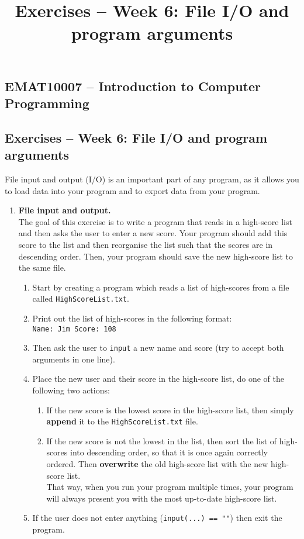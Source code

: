 \documentclass[11pt]{report}
\begin{document}
\title{Exercises -- Week 6: File I/O and program arguments}
\subsection*{EMAT10007 -- Introduction to Computer Programming}
\subsection*{Exercises -- Week 6: File I/O and program arguments}

File input and output (I/O) is an important part of any program, as it allows you to load data into your program and to export data from your program.

\begin{enumerate}
	\item {\bf File input and output.}\\
	The goal of this exercise is to write a program that reads in a high-score list and then asks the user to enter a new score. Your program should add this score to the list and then reorganise the list such that the scores are in descending order. Then, your program should save the new high-score list to the same file.
	\begin{enumerate}
		\item Start by creating a program which reads a list of high-scores from a file called {\tt HighScoreList.txt}.
		\item Print out the list of high-scores in the following format:\\
		{\tt Name: Jim Score: 108}
		\item Then ask the user to {\tt input} a new name and score (try to accept both arguments in one line).
		\item Place the new user and their score in the high-score list, do one of the following two actions:
		\begin{enumerate}
			\item If the new score is the lowest score in the high-score list, then simply \textbf{append} it to the {\tt HighScoreList.txt} file.
			\item If the new score is not the lowest in the list, then sort the list of high-scores into descending order, so that it is once again correctly ordered. Then \textbf{overwrite} the old high-score list with the new high-score list.\\
			That way, when you run your program multiple times, your program will always present you with the most up-to-date high-score list.
		\end{enumerate}
		\item If the user does not enter anything ({\tt input(...) == ""}) then exit the program.
	\end{enumerate}


\end{enumerate}
\end{document}
